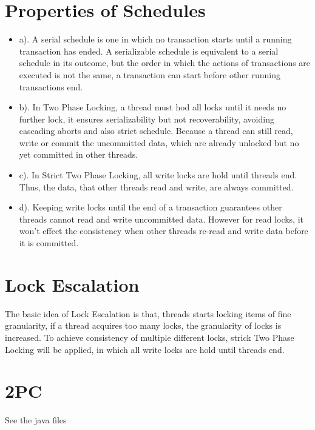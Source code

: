 \documentclass[a4paper, 14pt]{article}
\begin{document}
\section{Properties of Schedules}
\begin{itemize}
\item a). A serial schedule is one in which no transaction starts until a running transaction has ended. A serializable schedule is equivalent to a serial schedule in its outcome, but the order in which the actions of transactions are executed is not the same, a transaction can start before other running transactions end.
\item b). In Two Phase Locking, a thread must hod all locks until it needs no further lock, it ensures serializability but not recoverability, avoiding cascading aborts and also strict schedule. Because a thread can still read, write or commit the uncommitted data, which are already unlocked but no yet committed in other threads.
\item c). In Strict Two Phase Locking, all write locks are hold until threads end. Thus, the data, that other threads read and write, are always committed.
\item d). Keeping write locks until the end of a transaction guarantees other threads cannot read and write uncommitted data. However for read locks, it won't effect the consistency when other threads re-read and write data before it is committed.
\end{itemize}

\section{Lock Escalation}
The basic idea of Lock Escalation is that, threads starts locking items of fine granularity, if a thread acquires too many locks, the granularity of locks is increased. To achieve consistency of multiple different locks, strick Two Phase Locking will be applied, in which all write locks are hold until threads end. 

\section{2PC}
See the java files

%
\end{document}
